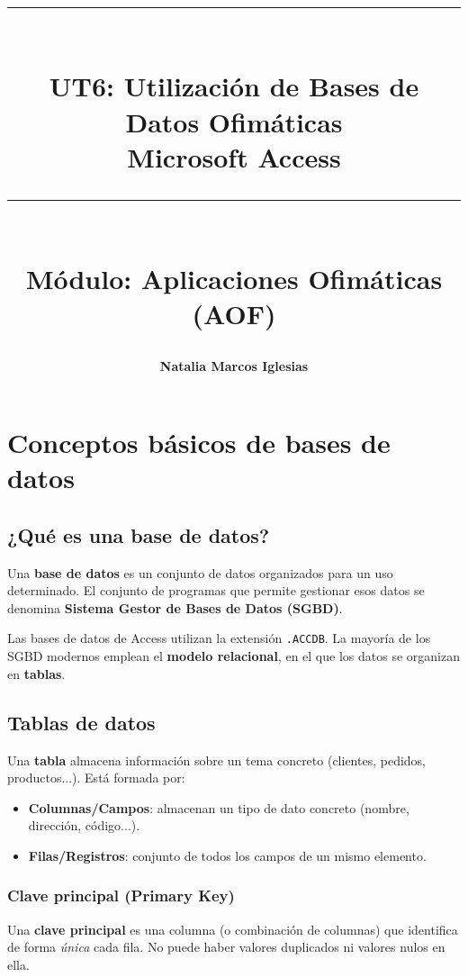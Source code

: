 \documentclass[12pt,a4paper]{article}
\title{
  \vspace{-1cm}
  {\color{accessred}\rule{\linewidth}{3pt}}\\[0.3cm]
  {\Huge\bfseries\color{accessred} UT6: Utilización de Bases de\\[0.2cm]
  Datos Ofimáticas}\\[0.3cm]
  {\Large\color{darkblue} Microsoft Access}\\[0.3cm]
  {\color{accessred}\rule{\linewidth}{1pt}}\\[0.2cm]
  {\large\color{gray} Módulo: Aplicaciones Ofimáticas (AOF)}
}
\author{\textbf{Natalia Marcos Iglesias}}
\date{}
\begin{document}
\maketitle
\thispagestyle{empty}

\tableofcontents
\newpage

\section{Conceptos básicos de bases de datos}

\subsection{¿Qué es una base de datos?}

\begin{definicion}
Una \textbf{base de datos} es un conjunto de datos organizados para un uso determinado. El conjunto de programas que permite gestionar esos datos se denomina \textbf{Sistema Gestor de Bases de Datos (SGBD)}.
\end{definicion}

Las bases de datos de Access utilizan la extensión \texttt{.ACCDB}. La mayoría de los SGBD modernos emplean el \textbf{modelo relacional}, en el que los datos se organizan en \textbf{tablas}.

\subsection{Tablas de datos}

Una \textbf{tabla} almacena información sobre un tema concreto (clientes, pedidos, productos...). Está formada por:

\begin{itemize}
  \item \textbf{Columnas/Campos}: almacenan un tipo de dato concreto (nombre, dirección, código...).
  \item \textbf{Filas/Registros}: conjunto de todos los campos de un mismo elemento.
\end{itemize}

\subsubsection{Clave principal (Primary Key)}

\begin{importante}
Una \textbf{clave principal} es una columna (o combinación de columnas) que identifica de forma \emph{única} cada fila. No puede haber valores duplicados ni valores nulos en ella.
\end{importante}
\end{document}

